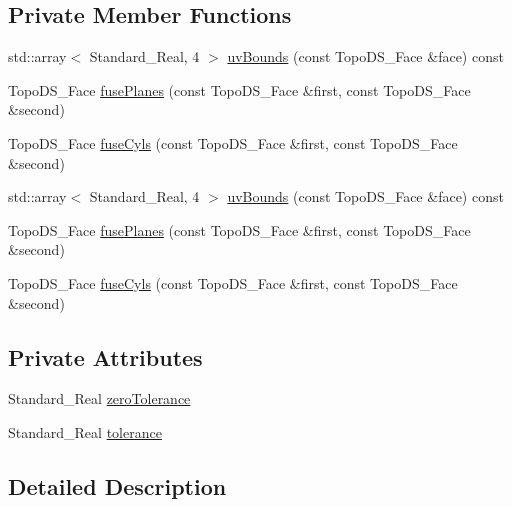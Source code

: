 \subsection*{Private Member Functions}
\begin{DoxyCompactItemize}
\item 
std\+::array$<$ Standard\+\_\+\+Real, 4 $>$ \hyperlink{classMcCAD_1_1Tools_1_1SurfacesFuser_a5525c22611c4982eeded8b867928e2db}{uv\+Bounds} (const Topo\+D\+S\+\_\+\+Face \&face) const
\item 
Topo\+D\+S\+\_\+\+Face \hyperlink{classMcCAD_1_1Tools_1_1SurfacesFuser_a8afb3a95157d8185bccdc4ba5f372ada}{fuse\+Planes} (const Topo\+D\+S\+\_\+\+Face \&first, const Topo\+D\+S\+\_\+\+Face \&second)
\item 
Topo\+D\+S\+\_\+\+Face \hyperlink{classMcCAD_1_1Tools_1_1SurfacesFuser_a803a59817fecd64ef1d8bf4a41c320ed}{fuse\+Cyls} (const Topo\+D\+S\+\_\+\+Face \&first, const Topo\+D\+S\+\_\+\+Face \&second)
\item 
std\+::array$<$ Standard\+\_\+\+Real, 4 $>$ \hyperlink{classMcCAD_1_1Tools_1_1SurfacesFuser_ab67c77b9bf4e860c5424bc91ca73095d}{uv\+Bounds} (const Topo\+D\+S\+\_\+\+Face \&face) const
\item 
Topo\+D\+S\+\_\+\+Face \hyperlink{classMcCAD_1_1Tools_1_1SurfacesFuser_a8afb3a95157d8185bccdc4ba5f372ada}{fuse\+Planes} (const Topo\+D\+S\+\_\+\+Face \&first, const Topo\+D\+S\+\_\+\+Face \&second)
\item 
Topo\+D\+S\+\_\+\+Face \hyperlink{classMcCAD_1_1Tools_1_1SurfacesFuser_a803a59817fecd64ef1d8bf4a41c320ed}{fuse\+Cyls} (const Topo\+D\+S\+\_\+\+Face \&first, const Topo\+D\+S\+\_\+\+Face \&second)
\end{DoxyCompactItemize}
\subsection*{Private Attributes}
\begin{DoxyCompactItemize}
\item 
Standard\+\_\+\+Real \hyperlink{classMcCAD_1_1Tools_1_1SurfacesFuser_a7ff8c39d261160d8c0e81be599ce9835}{zero\+Tolerance}
\item 
Standard\+\_\+\+Real \hyperlink{classMcCAD_1_1Tools_1_1SurfacesFuser_ad93b6c71e01c6b0692203d1671b7e8a4}{tolerance}
\end{DoxyCompactItemize}


\subsection{Detailed Description}


